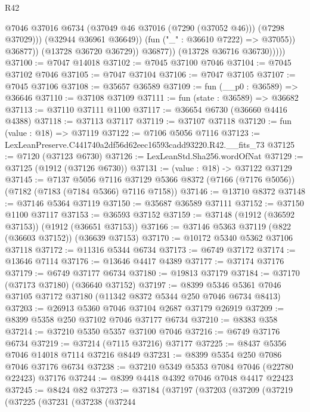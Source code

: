 \begin{lexlean}{R42}
\begin{coremodule}
{                              @7046
                              @37016
                              @6734
                              (@37049 @46 @37016 (@7290 (@37052 @46)))
                              (@7298 @37029)))
                          (@32944 @36961 @36649))
                        (fun ("_" : @36610 @7222) => @37055))
                      @36877))
                  (@13728 @36720 @36729))
                @36877))
            (@13728 @36716 @36730)))))
@37100 := @7047 @14018
@37102 := @7045 @37100 @7046
@37104 := @7045 @37102 @7046
@37105 := @7047 @37104
@37106 := @7047 @37105
@37107 := @7045 @37106
@37108 := @35657 @36589
@37109 := fun (__p0 : @36589) => @36646
@37110 := @37108 @37109
@37111 := fun (state : @36589) => @36682
@37113 := @37110 @37111 @1100
@37117 := @36654 @6730 (@36660 @4416 @4388)
@37118 := @37113 @37117
@37119 := @37107 @37118
@37120 := fun (value : @18) => @37119
@37122 := @7106 @5056 @7116
@37123 := LexLeanPreserve.C441740a2df56d62eec16593cadd93220.R42.__fits_73
@37125 := @7120 (@37123 @6730)
@37126 := LexLeanStd.Sha256.wordOfNat
@37129 := @37125 (@1912 (@37126 @6730))
@37131 := (value : @18) -> @37122 @37129
@37145 := @7137
    @5056
    @7116
    @37129
    @5366
    @8372
    (@7166 (@7176 @5056))
    (@7182 (@7183 (@7184 @5366) @7116 @7158))
@37146 := @13710 @8372
@37148 := @37146 @5364 @37119
@37150 := @35687 @36589 @37111
@37152 := @37150 @1100 @37117
@37153 := @36593 @37152
@37159 := @37148 (@1912 (@36592 @37153)) (@1912 (@36651 @37153))
@37166 := @37146 @5363 @37119 (@822 (@36603 @37152)) (@36639 @37153)
@37170 := @10172 @5340 @5362 @37106 @37118
@37172 := @11316 @5344 @6734
@37173 := @6749 @37172
@37174 := @13646 @7114
@37176 := @13646 @4417 @4389
@37177 := @37174 @37176
@37179 := @6749 @37177 @6734
@37180 := @19813 @37179
@37184 := @37170 (@37173 @37180) (@36640 @37152)
@37197 := @8399 @5346 @5361 @7046 @37105 @37172 @37180 (@11342 @8372 @5344 @250 @7046 @6734 @8413)
@37203 := @26913 @5360 @7046 @37104 @2687 @37179 @26919
@37209 := @8399 @5358 @250 @37102 @7046 @37177 @6734
@37210 := @8383 @358
@37214 := @37210 @5350 @5357 @37100 @7046
@37216 := @6749 @37176 @6734
@37219 := @37214 (@7115 @37216) @37177
@37225 := @8437 @5356 @7046 @14018 @7114 @37216 @8449
@37231 := @8399 @5354 @250 @7086 @7046 @37176 @6734
@37238 := @37210 @5349 @5353 @7084 @7046 (@22780 @22423) @37176
@37244 := @8399 @4418 @4392 @7046 @7048 @4417 @22423
@37245 := @8424 @82
@37273 := @37184
    (@37197
      (@37203
        (@37209
          (@37219
            (@37225
              (@37231
                (@37238
                  (@37244
}
\end{coremodule}
\end{lexlean}
